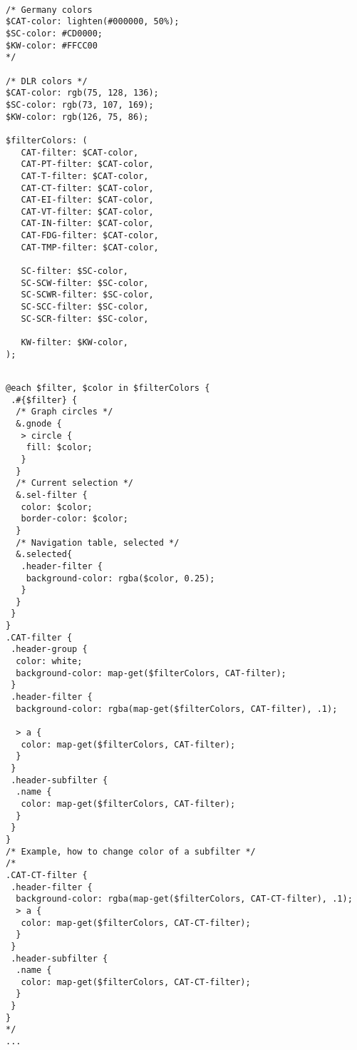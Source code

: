 \begin{listing}[H]
\begin{verbatim}
               
/* Germany colors
$CAT-color: lighten(#000000, 50%);
$SC-color: #CD0000;
$KW-color: #FFCC00
*/

/* DLR colors */
$CAT-color: rgb(75, 128, 136);
$SC-color: rgb(73, 107, 169);
$KW-color: rgb(126, 75, 86);

$filterColors: (
   CAT-filter: $CAT-color,
   CAT-PT-filter: $CAT-color,
   CAT-T-filter: $CAT-color, 
   CAT-CT-filter: $CAT-color,
   CAT-EI-filter: $CAT-color,
   CAT-VT-filter: $CAT-color,
   CAT-IN-filter: $CAT-color,
   CAT-FDG-filter: $CAT-color,
   CAT-TMP-filter: $CAT-color, 
   
   SC-filter: $SC-color,
   SC-SCW-filter: $SC-color,
   SC-SCWR-filter: $SC-color, 
   SC-SCC-filter: $SC-color,
   SC-SCR-filter: $SC-color,
   
   KW-filter: $KW-color,
);

    \end{verbatim}
	\caption{Ejemplo de paleta de colores en \gls{kf2} para \gls{strada}}
	\label{code:colorssass}
\end{listing}

\begin{listing}[H]
\begin{verbatim}
               
@each $filter, $color in $filterColors {
 .#{$filter} {
  /* Graph circles */
  &.gnode {
   > circle {
    fill: $color;
   }
  }
  /* Current selection */
  &.sel-filter {
   color: $color;
   border-color: $color;
  }
  /* Navigation table, selected */
  &.selected{
   .header-filter {
    background-color: rgba($color, 0.25);
   }
  }
 }
}
.CAT-filter {
 .header-group {
  color: white;
  background-color: map-get($filterColors, CAT-filter);
 }
 .header-filter {
  background-color: rgba(map-get($filterColors, CAT-filter), .1);
  
  > a {
   color: map-get($filterColors, CAT-filter);
  }
 }
 .header-subfilter { 
  .name {
   color: map-get($filterColors, CAT-filter);
  }
 }
}
/* Example, how to change color of a subfilter */
/*
.CAT-CT-filter {
 .header-filter {
  background-color: rgba(map-get($filterColors, CAT-CT-filter), .1);
  > a {
   color: map-get($filterColors, CAT-CT-filter);
  }
 }
 .header-subfilter { 
  .name {
   color: map-get($filterColors, CAT-CT-filter);
  }
 }
}
*/
...
    \end{verbatim}
	\caption{Ejemplo de aplicación de la paleta de colores en \gls{kf2} para \gls{strada}}
	\label{code:colorssass2}
\end{listing}


